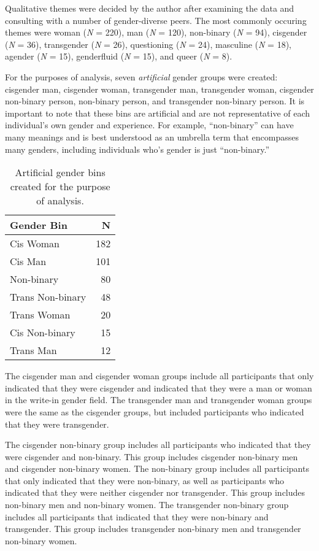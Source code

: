 \documentclass[12pt,twoside]{reedthesis}
\begin{document}
Qualitative themes were decided by the author after examining the data and consulting with a number of gender-diverse peers. The most commonly occuring themes were woman (\emph{N} = 220), man (\emph{N} = 120), non-binary (\emph{N} = 94), cisgender (\emph{N} = 36), transgender (\emph{N} = 26), questioning (\emph{N} = 24), masculine (\emph{N} = 18), agender (\emph{N} = 15), genderfluid (\emph{N} = 15), and queer (\emph{N} = 8).

For the purposes of analysis, seven \emph{artificial} gender groups were created: cisgender man, cisgender woman, transgender man, transgender woman, cisgender non-binary person, non-binary person, and transgender non-binary person. It is important to note that these bins are artificial and are not representative of each individual's own gender and experience. For example, ``non-binary'' can have many meanings and is best understood as an umbrella term that encompasses many genders, including individuals who's gender is just ``non-binary.''
\begin{table}

\caption{\label{tab:unnamed-chunk-3}Artificial gender bins created for the purpose of analysis.}
\centering
\begin{tabular}[t]{l|r}
\hline
Gender Bin & N\\
\hline
Cis Woman & 182\\
\hline
Cis Man & 101\\
\hline
Non-binary & 80\\
\hline
Trans Non-binary & 48\\
\hline
Trans Woman & 20\\
\hline
Cis Non-binary & 15\\
\hline
Trans Man & 12\\
\hline
\end{tabular}
\end{table}
The cisgender man and cisgender woman groups include all participants that only indicated that they were cisgender and indicated that they were a man or woman in the write-in gender field. The transgender man and transgender woman groups were the same as the cisgender groups, but included participants who indicated that they were transgender.

The cisgender non-binary group includes all participants who indicated that they were cisgender and non-binary. This group includes cisgender non-binary men and cisgender non-binary women. The non-binary group includes all participants that only indicated that they were non-binary, as well as participants who indicated that they were neither cisgender nor transgender. This group includes non-binary men and non-binary women. The transgender non-binary group includes all participants that indicated that they were non-binary and transgender. This group includes transgender non-binary men and transgender non-binary women.
\end{document}
